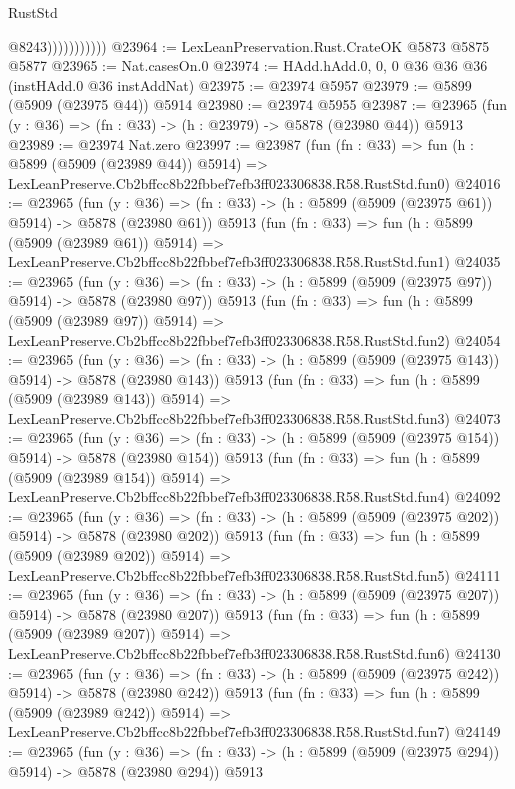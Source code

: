 \begin{lexlean}{RustStd}
\begin{coremodule}
{{                          @8243)))))))))))
@23964 := LexLeanPreservation.Rust.CrateOK @5873 @5875 @5877
@23965 := Nat.casesOn.{0}
@23974 := HAdd.hAdd.{0, 0, 0} @36 @36 @36 (instHAdd.{0} @36 instAddNat)
@23975 := @23974 @5957
@23979 := @5899 (@5909 (@23975 @44)) @5914
@23980 := @23974 @5955
@23987 := @23965 (fun (y : @36) => (fn : @33) -> (h : @23979) -> @5878 (@23980 @44)) @5913
@23989 := @23974 Nat.zero
@23997 := @23987
    (fun (fn : @33) =>
    fun (h : @5899 (@5909 (@23989 @44)) @5914) =>
    LexLeanPreserve.Cb2bffcc8b22fbbef7efb3ff023306838.R58.RustStd.fun0)
@24016 := @23965
    (fun (y : @36) => (fn : @33) -> (h : @5899 (@5909 (@23975 @61)) @5914) -> @5878 (@23980 @61))
    @5913
    (fun (fn : @33) =>
    fun (h : @5899 (@5909 (@23989 @61)) @5914) =>
    LexLeanPreserve.Cb2bffcc8b22fbbef7efb3ff023306838.R58.RustStd.fun1)
@24035 := @23965
    (fun (y : @36) => (fn : @33) -> (h : @5899 (@5909 (@23975 @97)) @5914) -> @5878 (@23980 @97))
    @5913
    (fun (fn : @33) =>
    fun (h : @5899 (@5909 (@23989 @97)) @5914) =>
    LexLeanPreserve.Cb2bffcc8b22fbbef7efb3ff023306838.R58.RustStd.fun2)
@24054 := @23965
    (fun (y : @36) => (fn : @33) -> (h : @5899 (@5909 (@23975 @143)) @5914) -> @5878 (@23980 @143))
    @5913
    (fun (fn : @33) =>
    fun (h : @5899 (@5909 (@23989 @143)) @5914) =>
    LexLeanPreserve.Cb2bffcc8b22fbbef7efb3ff023306838.R58.RustStd.fun3)
@24073 := @23965
    (fun (y : @36) => (fn : @33) -> (h : @5899 (@5909 (@23975 @154)) @5914) -> @5878 (@23980 @154))
    @5913
    (fun (fn : @33) =>
    fun (h : @5899 (@5909 (@23989 @154)) @5914) =>
    LexLeanPreserve.Cb2bffcc8b22fbbef7efb3ff023306838.R58.RustStd.fun4)
@24092 := @23965
    (fun (y : @36) => (fn : @33) -> (h : @5899 (@5909 (@23975 @202)) @5914) -> @5878 (@23980 @202))
    @5913
    (fun (fn : @33) =>
    fun (h : @5899 (@5909 (@23989 @202)) @5914) =>
    LexLeanPreserve.Cb2bffcc8b22fbbef7efb3ff023306838.R58.RustStd.fun5)
@24111 := @23965
    (fun (y : @36) => (fn : @33) -> (h : @5899 (@5909 (@23975 @207)) @5914) -> @5878 (@23980 @207))
    @5913
    (fun (fn : @33) =>
    fun (h : @5899 (@5909 (@23989 @207)) @5914) =>
    LexLeanPreserve.Cb2bffcc8b22fbbef7efb3ff023306838.R58.RustStd.fun6)
@24130 := @23965
    (fun (y : @36) => (fn : @33) -> (h : @5899 (@5909 (@23975 @242)) @5914) -> @5878 (@23980 @242))
    @5913
    (fun (fn : @33) =>
    fun (h : @5899 (@5909 (@23989 @242)) @5914) =>
    LexLeanPreserve.Cb2bffcc8b22fbbef7efb3ff023306838.R58.RustStd.fun7)
@24149 := @23965
    (fun (y : @36) => (fn : @33) -> (h : @5899 (@5909 (@23975 @294)) @5914) -> @5878 (@23980 @294))
    @5913
}}
\end{coremodule}
\end{lexlean}
